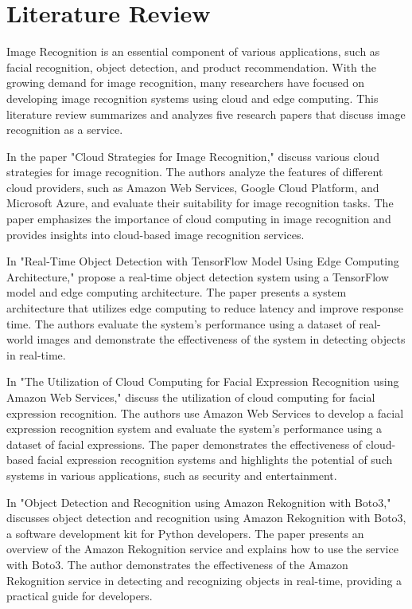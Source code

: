 \documentclass[../main.tex]{subfiles}
\begin{document}
\part*{Literature Review}
Image Recognition is an essential component of various applications, such as facial recognition, object detection, and product recommendation. With the growing demand for image recognition, many researchers have focused on developing image recognition systems using cloud and edge computing. This literature review summarizes and analyzes five research papers that discuss image recognition as a service.

In the paper "Cloud Strategies for Image Recognition," \citet{9244200} discuss various cloud strategies for image recognition. The authors analyze the features of different cloud providers, such as Amazon Web Services, Google Cloud Platform, and Microsoft Azure, and evaluate their suitability for image recognition tasks. The paper emphasizes the importance of cloud computing in image recognition and provides insights into cloud-based image recognition services.

In "Real-Time Object Detection with TensorFlow Model Using Edge Computing Architecture," \citet{9782169} propose a real-time object detection system using a TensorFlow model and edge computing architecture. The paper presents a system architecture that utilizes edge computing to reduce latency and improve response time. The authors evaluate the system's performance using a dataset of real-world images and demonstrate the effectiveness of the system in detecting objects in real-time.

In "The Utilization of Cloud Computing for Facial Expression Recognition using Amazon Web Services," \citet{9297974} discuss the utilization of cloud computing for facial expression recognition. The authors use Amazon Web Services to develop a facial expression recognition system and evaluate the system's performance using a dataset of facial expressions. The paper demonstrates the effectiveness of cloud-based facial expression recognition systems and highlights the potential of such systems in various applications, such as security and entertainment.

In "Object Detection and Recognition using Amazon Rekognition with Boto3," \citet{9776884} discusses object detection and recognition using Amazon Rekognition with Boto3, a software development kit for Python developers. The paper presents an overview of the Amazon Rekognition service and explains how to use the service with Boto3. The author demonstrates the effectiveness of the Amazon Rekognition service in detecting and recognizing objects in real-time, providing a practical guide for developers.
\end{document}
